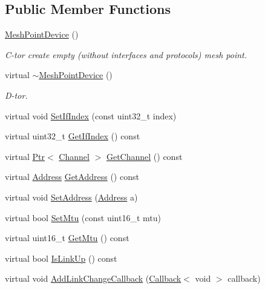 \subsection*{Public Member Functions}
\begin{DoxyCompactItemize}
\item 
\hyperlink{classns3_1_1MeshPointDevice_a8f30cce92eb76c9caf89ca44c6fbad4b}{Mesh\+Point\+Device} ()
\begin{DoxyCompactList}\small\item\em C-\/tor create empty (without interfaces and protocols) mesh point. \end{DoxyCompactList}\item 
virtual \hyperlink{classns3_1_1MeshPointDevice_a8f93896ef5c3a846905fa529534f7d68}{$\sim$\+Mesh\+Point\+Device} ()
\begin{DoxyCompactList}\small\item\em D-\/tor. \end{DoxyCompactList}\item 
virtual void \hyperlink{classns3_1_1MeshPointDevice_a5c488f7ac1f53721cc782840036fca5a}{Set\+If\+Index} (const uint32\+\_\+t index)
\item 
virtual uint32\+\_\+t \hyperlink{classns3_1_1MeshPointDevice_af9f6b14ebf81365ca9162712eb232a4c}{Get\+If\+Index} () const 
\item 
virtual \hyperlink{classns3_1_1Ptr}{Ptr}$<$ \hyperlink{classns3_1_1Channel}{Channel} $>$ \hyperlink{classns3_1_1MeshPointDevice_a3a6b755ff27de635152d55191db0fa60}{Get\+Channel} () const 
\item 
virtual \hyperlink{classns3_1_1Address}{Address} \hyperlink{classns3_1_1MeshPointDevice_a4b81948cadc3648639b306149221a4c5}{Get\+Address} () const 
\item 
virtual void \hyperlink{classns3_1_1MeshPointDevice_ad15af2645cde05de3d91aaacd77849bd}{Set\+Address} (\hyperlink{classns3_1_1Address}{Address} a)
\item 
virtual bool \hyperlink{classns3_1_1MeshPointDevice_a55081bcaa93f7dabff588ab6602388c6}{Set\+Mtu} (const uint16\+\_\+t mtu)
\item 
virtual uint16\+\_\+t \hyperlink{classns3_1_1MeshPointDevice_a49c4b789a364ce823accd6a28e4b38be}{Get\+Mtu} () const 
\item 
virtual bool \hyperlink{classns3_1_1MeshPointDevice_a17b8bff37f427361a5f197601a65c0ef}{Is\+Link\+Up} () const 
\item 
virtual void \hyperlink{classns3_1_1MeshPointDevice_aee3bb56e67a9d6eaaba98400cf7b8bb3}{Add\+Link\+Change\+Callback} (\hyperlink{classns3_1_1Callback}{Callback}$<$ void $>$ callback)

\end{DoxyCompactItemize}
